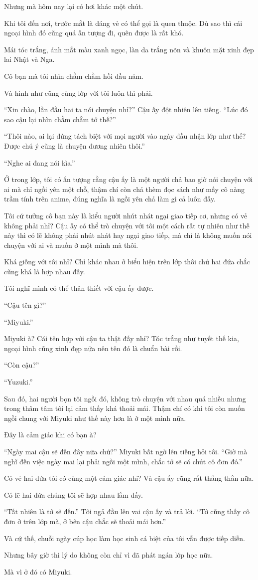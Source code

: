 {Nhưng mà hôm nay lại có hơi khác một chút.

Khi tôi đến nơi, trước mắt là dáng vẻ có thể gọi là quen thuộc. Dù sao
thì cái ngoại hình đó cũng quá ấn tượng đi, quên được là rất khó.

Mái tóc trắng, ánh mắt màu xanh ngọc, làn da trắng nõn và khuôn mặt xinh
đẹp lai Nhật và Nga.

Cô bạn mà tôi nhìn chằm chằm hồi đầu năm.

Và hình như cũng cùng lớp với tôi luôn thì phải.

``Xin chào, lần đầu hai ta nói chuyện nhỉ?'' Cậu ấy đột nhiên lên tiếng.
``Lúc đó sao cậu lại nhìn chằm chằm tớ thế?''

``Thôi nào, ai lại đứng tách biệt với mọi người vào ngày đầu nhận lớp
như thế? Được chú ý cũng là chuyện đương nhiên thôi.''

``Nghe ai đang nói kìa.''

Ở trong lớp, tôi có ấn tượng rằng cậu ấy là một người chả bao giờ nói
chuyện với ai mà chỉ ngồi yên một chỗ, thậm chí còn chả thèm đọc sách
như mấy cô nàng trầm tính trên anime, đúng nghĩa là ngồi yên chả làm gì
cả luôn đấy.

Tôi cứ tưởng cô bạn này là kiểu người nhút nhát ngại giao tiếp cơ, nhưng
có vẻ không phải nhỉ? Cậu ấy có thể trò chuyện với tôi một cách rất tự
nhiên như thế này thì có lẽ không phải nhút nhát hay ngại giao tiếp, mà
chỉ là không muốn nói chuyện với ai và muốn ở một mình mà thôi.

Khá giống với tôi nhỉ? Chỉ khác nhau ở biểu hiện trên lớp thôi chứ hai
đứa chắc cũng khá là hợp nhau đấy.

Tôi nghĩ mình có thể thân thiết với cậu ấy được.

``Cậu tên gì?''

``Miyuki.''

Miyuki à? Cái tên hợp với cậu ta thật đấy nhỉ? Tóc trắng như tuyết thế
kia, ngoại hình cũng xinh đẹp nữa nên tên đó là chuẩn bài rồi.

``Còn cậu?''

``Yuzuki.''

Sau đó, hai người bọn tôi ngồi đó, không trò chuyện với nhau quá nhiều
nhưng trong thâm tâm tôi lại cảm thấy khá thoải mái. Thậm chí có khi tôi
còn muốn ngồi chung với Miyuki như thế này hơn là ở một mình nữa.

Đây là cảm giác khi có bạn à?

``Ngày mai cậu sẽ đến đây nữa chứ?'' Miyuki bất ngờ lên tiếng hỏi tôi.
``Giờ mà nghĩ đến việc ngày mai lại phải ngồi một mình, chắc tớ sẽ có
chút cô đơn đó.''

Có vẻ hai đứa tôi có cùng một cảm giác nhỉ? Và cậu ấy cũng rất thẳng
thắn nữa.

Có lẽ hai đứa chúng tôi sẽ hợp nhau lắm đấy.

``Tất nhiên là tớ sẽ đến.'' Tôi ngả đầu lên vai cậu ấy và trả lời. ``Tớ
cũng thấy cô đơn ở trên lớp mà, ở bên cậu chắc sẽ thoải mái hơn.''

Và cứ thế, chuỗi ngày cúp học làm học sinh cá biệt của tôi vẫn được tiếp
diễn.

Nhưng bây giờ thì lý do không còn chỉ vì đã phát ngán lớp học nữa.

Mà vì ở đó có Miyuki.
}
